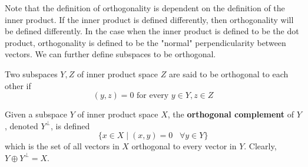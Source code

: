   Note that the definition of orthogonality is dependent on the definition of the inner product. If the inner product is defined differently, then orthogonality will be defined differently. In the case when the inner product is defined to be the dot product, orthogonality is defined to be the "normal" perpendicularity between vectors. We can further define subspaces to be orthogonal. 

  \begin{definition}
    Two subspaces $Y, Z$ of inner product space $Z$ are said to be orthogonal to each other if 
    \begin{equation}
      (y, z) = 0 \text{   for every } y \in Y, z \in Z
    \end{equation}
  \end{definition}

  \begin{definition}
    Given a subspace $Y$ of inner product space $X$, the \textbf{orthogonal complement} of $Y$, denoted $Y^\perp$, is defined
    \begin{equation}
      \{ x \in X \; | \; (x, y) = 0 \;\;\; \forall y \in Y\}
    \end{equation}
    which is the set of all vectors in $X$ orthogonal to every vector in $Y$. Clearly, $Y \oplus Y^\perp = X$. 
  \end{definition}

  \begin{algo}
    
  \end{algo}

